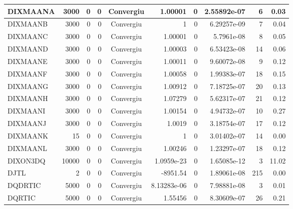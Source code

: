 \begin{center}
\begin{longtable}{|l|r|r|r|c|r|r|r|r|r|}
DIXMAANA &   3000 &      0 &      0 & Convergiu  &     1.00001 &              0 & 2.55892e-07 &      6 &    0.03 \\ \hline
DIXMAANB &   3000 &      0 &      0 & Convergiu  &           1 &              0 & 6.29257e-09 &      7 &    0.04 \\ \hline
DIXMAANC &   3000 &      0 &      0 & Convergiu  &     1.00001 &              0 &  5.7961e-08 &      8 &    0.05 \\ \hline
DIXMAAND &   3000 &      0 &      0 & Convergiu  &     1.00003 &              0 & 6.53423e-08 &     14 &    0.06 \\ \hline
DIXMAANE &   3000 &      0 &      0 & Convergiu  &     1.00011 &              0 & 9.60072e-08 &      9 &    0.12 \\ \hline
DIXMAANF &   3000 &      0 &      0 & Convergiu  &     1.00058 &              0 & 1.99383e-07 &     18 &    0.15 \\ \hline
DIXMAANG &   3000 &      0 &      0 & Convergiu  &     1.00912 &              0 & 7.18725e-07 &     20 &    0.13 \\ \hline
DIXMAANH &   3000 &      0 &      0 & Convergiu  &     1.07279 &              0 & 5.62317e-07 &     21 &    0.12 \\ \hline
DIXMAANI &   3000 &      0 &      0 & Convergiu  &     1.00154 &              0 & 4.94732e-07 &     10 &    0.27 \\ \hline
DIXMAANJ &   3000 &      0 &      0 & Convergiu  &      1.0019 &              0 & 3.18754e-07 &     17 &    0.12 \\ \hline
DIXMAANK &     15 &      0 &      0 & Convergiu  &           1 &              0 & 3.01402e-07 &     14 &    0.00 \\ \hline
DIXMAANL &   3000 &      0 &      0 & Convergiu  &     1.00246 &              0 & 1.23297e-07 &     18 &    0.12 \\ \hline
DIXON3DQ &  10000 &      0 &      0 & Convergiu  &  1.0959e-23 &              0 & 1.65085e-12 &      3 &   11.02 \\ \hline
    DJTL &      2 &      0 &      0 & Convergiu  &    -8951.54 &              0 & 1.89061e-08 &    215 &    0.00 \\ \hline
 DQDRTIC &   5000 &      0 &      0 & Convergiu  & 8.13283e-06 &              0 & 7.98881e-08 &      3 &    0.01 \\ \hline
  DQRTIC &   5000 &      0 &      0 & Convergiu  &     1.55456 &              0 & 8.30609e-07 &     26 &    0.21 \\ \hline

\end{longtable}
\end{center}
